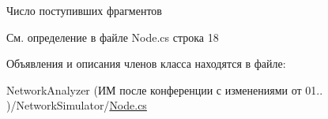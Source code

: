Число поступивших фрагментов 



См. определение в файле Node.\+cs строка 18



Объявления и описания членов класса находятся в файле\+:\begin{DoxyCompactItemize}
\item 
Network\+Analyzer (ИМ после конференции  с изменениями от 01.. )/\+Network\+Simulator/\hyperlink{_node_8cs}{Node.\+cs}\end{DoxyCompactItemize}
